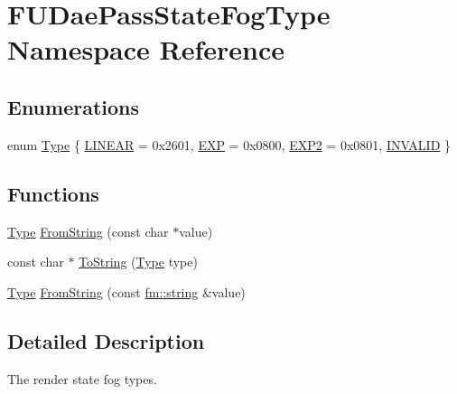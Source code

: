 \hypertarget{namespaceFUDaePassStateFogType}{
\section{FUDaePassStateFogType Namespace Reference}
\label{namespaceFUDaePassStateFogType}
}
\subsection*{Enumerations}
\begin{DoxyCompactItemize}
\item 
enum \hyperlink{namespaceFUDaePassStateFogType_a6948e65c23073e5eb5f0b3aaa5a55186}{Type} \{ \hyperlink{namespaceFUDaePassStateFogType_a6948e65c23073e5eb5f0b3aaa5a55186ab1b9734af104d5a30848bcccc048c2e2}{LINEAR} =  0x2601, 
\hyperlink{namespaceFUDaePassStateFogType_a6948e65c23073e5eb5f0b3aaa5a55186a49e2b4ebea3196288a2bb84f34c103aa}{EXP} =  0x0800, 
\hyperlink{namespaceFUDaePassStateFogType_a6948e65c23073e5eb5f0b3aaa5a55186a7ec04210752ef60a5a9f0d4588675696}{EXP2} =  0x0801, 
\hyperlink{namespaceFUDaePassStateFogType_a6948e65c23073e5eb5f0b3aaa5a55186a390d7e1de73c4ad98cfd675153d132a0}{INVALID}
 \}
\end{DoxyCompactItemize}
\subsection*{Functions}
\begin{DoxyCompactItemize}
\item 
\hyperlink{namespaceFUDaePassStateFogType_a6948e65c23073e5eb5f0b3aaa5a55186}{Type} \hyperlink{namespaceFUDaePassStateFogType_aef18d2cc2247a101b4a134fc21c66447}{FromString} (const char $\ast$value)
\item 
const char $\ast$ \hyperlink{namespaceFUDaePassStateFogType_a85184e44bf9a8d20b450302c50535ebd}{ToString} (\hyperlink{namespaceFUDaePassStateFogType_a6948e65c23073e5eb5f0b3aaa5a55186}{Type} type)
\item 
\hyperlink{namespaceFUDaePassStateFogType_a6948e65c23073e5eb5f0b3aaa5a55186}{Type} \hyperlink{namespaceFUDaePassStateFogType_af9c7a3de292cd98b99a68d996cfb7b40}{FromString} (const \hyperlink{classfm_1_1stringT}{fm::string} \&value)
\end{DoxyCompactItemize}


\subsection{Detailed Description}
The render state fog types. 

